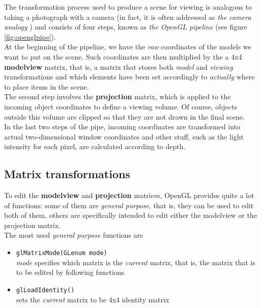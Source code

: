 The transformation process used to produce a scene for viewing 
is analogous to taking a photograph with a camera (in fact, it 
is often addressed as \textit{the camera analogy} 
\cite{opengl:cameraanalogy}) 
and consists of four steps, known as
\textit{the OpenGL pipeline} (see figure \ref{fig:openglpipe}).
\\
At the beginning of the pipeline, we have the \textit{raw} 
coordinates of the models we want to put on the scene. Such 
coordinates are then multiplied by the a 4x4 \textbf{modelview} 
matrix, that is, a matrix that stores both \textit{model} and 
\textit{viewing} transformations and which elements have been set 
accordingly to \textit{actually} where to place items in the scene.
\\
The second step involves the \textbf{projection} matrix, 
which is applied to the incoming object coordinates to define a 
viewing volume. Of course, objects outside this volume are clipped 
so that they are not drawn in the final scene. 
\\
In the last two steps of the pipe, incoming coordinates are transformed 
into actual two-dimensional window coordinates and other stuff, such as 
the light intensity for each pixel, are calculated according to depth.

\subsection{Matrix transformations}
\label{opengl:opengl_note:matrix_transfor}

To edit the \textbf{modelview} and \textbf{projection} matrices, OpenGL 
provides quite a lot of functions: some of them are 
\textit{general purpose}, that is, they can be used to edit both of them, 
others are specifically intended to edit either the modelview or the 
projection matrix.
\\
The most used \textit{general purpose} functions are 

\begin{itemize}
\item \texttt{glMatrixMode(GLenum mode)} \\
  \textit{mode} specifies which matrix is the \textit{current}
  matrix, that is, the matrix that is to be edited by following
  functions
  
\item \texttt{glLoadIdentity()} \\
  sets the \textit{current} matrix to be 4x4 identity matrix
\end{itemize}

